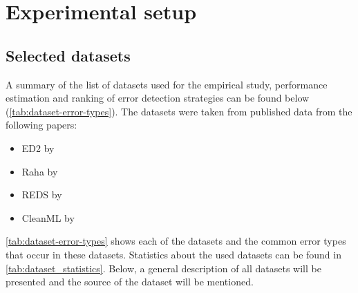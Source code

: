 \chapter{Experimental setup}
\section{Selected datasets}
\label{sec:selected_datasets}
A summary of the list of datasets used for the empirical study, performance estimation and ranking of error detection strategies can be found below (\autoref{tab:dataset-error-types}). The datasets were taken from published data from the following papers: 
\begin{itemize}
    \item ED2 by \cite{Neutatz2019-aw}
    \item Raha by \cite{Mahdavi2019-zf}
    \item REDS by \cite{Mahdavi2019-pk}
    \item CleanML by \cite{Li2019-ve}
\end{itemize}

\autoref{tab:dataset-error-types} shows each of the datasets and the common error types that occur in these datasets. Statistics about the used datasets can be found in \autoref{tab:dataset_statistics}. Below, a general description of all datasets will be presented and the source of the dataset will be mentioned.

